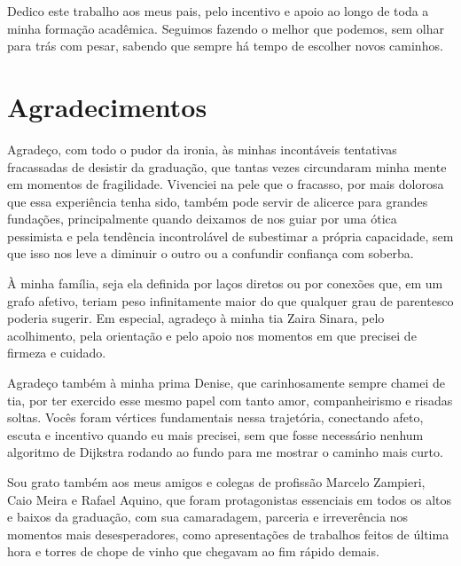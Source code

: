 \documentclass[a4paper,12pt]{article}
\begin{document}
\setcounter{page}{1}

\clearpage
\thispagestyle{empty}
\vspace*{\fill}
\begin{flushright}
\begin{minipage}{0.60\textwidth}
\setlength{\parindent}{0pt}
\justifying
Dedico este trabalho aos meus pais, pelo incentivo e apoio ao longo de
toda a minha formação acadêmica. Seguimos fazendo o melhor que podemos,
sem olhar para trás com pesar, sabendo que sempre há tempo de escolher
novos caminhos.
\end{minipage}
\end{flushright}
\vspace*{\fill}

\clearpage
\section*{Agradecimentos}

Agradeço, com todo o pudor da ironia, às minhas incontáveis tentativas
fracassadas de desistir da graduação, que tantas vezes circundaram minha
mente em momentos de fragilidade. Vivenciei na pele que o fracasso, por
mais dolorosa que essa experiência tenha sido, também pode servir de
alicerce para grandes fundações, principalmente quando deixamos de nos
guiar por uma ótica pessimista e pela tendência incontrolável de
subestimar a própria capacidade, sem que isso nos leve a diminuir o
outro ou a confundir confiança com soberba.

À minha família, seja ela definida por laços diretos ou por conexões que,
em um grafo afetivo, teriam peso infinitamente maior do que qualquer grau
de parentesco poderia sugerir. Em especial, agradeço à minha tia Zaira
Sinara, pelo acolhimento, pela orientação e pelo apoio nos momentos em
que precisei de firmeza e cuidado.

Agradeço também à minha prima Denise, que carinhosamente sempre chamei
de tia, por ter exercido esse mesmo papel com tanto amor, companheirismo
e risadas soltas. Vocês foram vértices fundamentais nessa trajetória,
conectando afeto, escuta e incentivo quando eu mais precisei, sem que
fosse necessário nenhum algoritmo de Dijkstra rodando ao fundo para me
mostrar o caminho mais curto.

Sou grato também aos meus amigos e colegas de profissão Marcelo
Zampieri, Caio Meira e Rafael Aquino, que foram protagonistas essenciais
em todos os altos e baixos da graduação, com sua camaradagem, parceria e
irreverência nos momentos mais desesperadores, como apresentações de
trabalhos feitos de última hora e torres de chope de vinho que chegavam
ao fim rápido demais.
\end{document}
